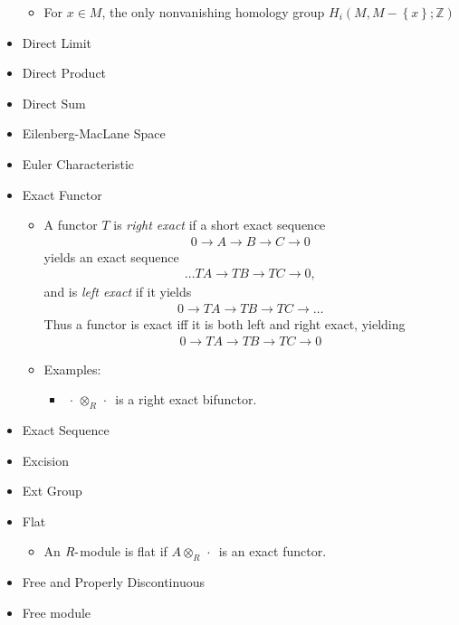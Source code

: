 \begin{itemize}
  \begin{itemize}
  \tightlist
  \item
    For \(x\in M\), the only nonvanishing homology group
    \(H_i(M, M - \left\{{x}\right\}; {\mathbb{Z}})\)
  \end{itemize}
\item
  Direct Limit
\item
  Direct Product
\item
  Direct Sum
\item
  Eilenberg-MacLane Space
\item
  Euler Characteristic
\item
  Exact Functor

  \begin{itemize}
  \tightlist
  \item
    A functor \(T\) is \emph{right exact} if a short exact sequence
    \begin{align*}0 \to A \to B \to C \to 0\end{align*}
    yields an exact sequence
    \begin{align*}\ldots TA \to TB \to TC \to 0,\end{align*}
    and is \emph{left exact} if it yields
    \begin{align*}0 \to TA \to TB \to TC \to \ldots\end{align*}
    Thus a functor is exact iff it is both left and right exact,
    yielding
    \begin{align*}
      0 \to TA \to TB \to TC \to 0
      \end{align*}
  \item
    Examples:

    \begin{itemize}
    \tightlist
    \item
      \({\,\cdot\,}\otimes_R {\,\cdot\,}\) is a right exact bifunctor.
    \end{itemize}
  \end{itemize}
\item
  Exact Sequence
\item
  Excision
\item
  Ext Group
\item
  Flat

  \begin{itemize}
  \tightlist
  \item
    An \(R{\hbox{-}}\)module is flat if \(A\otimes_R {\,\cdot\,}\) is an
    exact functor.
  \end{itemize}
\item
  Free and Properly Discontinuous
\item
  Free module


\end{itemize}
